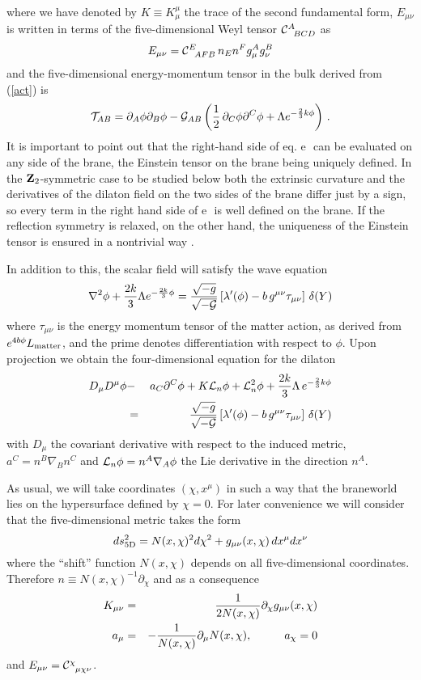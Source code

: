 \documentclass[prd,a4paper,twocolumn,superscriptaddress,nofootinbib,showpacs]{revtex4}
\def\CL{{\cal L}} \def\CH{{\cal H}} \def\CI{{\cal I}} \def\CU{{\cal U}}
\def\half{{1\over 2}\,}
\def\ee{{\rm e}\,}
\begin{document}
where we have denoted by $K\equiv K_{\mu}^{\mu}$ the trace of the second fundamental form, 
$E_{\mu\nu}$ is written in terms of the five-dimensional Weyl tensor ${\cal C}^{A}_{\,\,\,\,BCD}$ as
$$
E_{\mu\nu}={\cal C}^{E}_{\,\,\,\,AFB}\,n_{E}n^{F}g^{A}_{\mu}g^{B}_{\nu}
$$
and the five-dimensional energy-momentum tensor in the bulk derived from (\ref{act}) is
\begin{equation}
\CT_{AB}=\partial_{A}\phi\partial_{B}\phi-\CG_{AB}\left(\half \partial_{C}\phi
\partial^{C}\phi+\Lambda e^{-{2\over 3}k\phi}\right)\,.
\label{em}
\end{equation}
It is important to point out that the right-hand side of eq. \ee\ can be evaluated on any side of the brane,
the Einstein tensor on the brane being uniquely defined.  In the 
${\bf Z}_{2}$-symmetric case to be studied below both the extrinsic curvature and the derivatives of the
dilaton field on the two sides of the brane differ just by a sign, so every term in the right hand side of \ee\ is
well defined on the brane. If the reflection symmetry is relaxed, on the other hand, the uniqueness of the 
Einstein tensor is ensured in a nontrivial way \cite{bcmu}.

In addition to this, the scalar field will satisfy the wave equation
\begin{equation}
\nabla^2\phi+{2k\over 3}\Lambda e^{-{2k\over 3}\phi}={\sqrt{-g}\over \sqrt{-{\cal G}}}
\left[\lambda'(\phi)-b\,g^{\mu\nu}\tau_{\mu\nu}
\right]\,\delta(Y)
\label{dilat}
\end{equation}
where $\tau_{\mu\nu}$ is the energy momentum tensor of the matter action, as derived from 
$e^{4b\phi}L_{\rm matter}$, and
the prime denotes differentiation with respect to $\phi$.
Upon projection we obtain the four-dimensional equation for the dilaton
\begin{eqnarray}
D_{\mu}D^{\mu}\phi &-& a_{C}\partial^{C}\phi+K\CL_{n}\phi+\CL_{n}^2\phi+{2k\over 3}\Lambda\,
e^{-{2\over 3}k\phi} \nonumber \\
&=&{\sqrt{-g}\over \sqrt{-\CG}}\left[\lambda'(\phi)-b\,g^{\mu\nu}\tau_{\mu\nu}
\right]\,\delta(Y)
\end{eqnarray}
with $D_{\mu}$ the covariant derivative with respect to the induced metric, 
$a^{C}=n^{B}\nabla_{B}n^{C}$ and $\CL_{n}\phi=n^{A}\nabla_{A}\phi$ the Lie derivative in the direction 
$n^{A}$.


As usual, we will take coordinates $(\chi,x^{\mu})$ in such a way that the braneworld lies on the 
hypersurface defined by $\chi=0$. For later convenience we will consider that the 
five-dimensional metric takes the form
$$
ds^{2}_{\rm 5D} = N(x,\chi)^{2}d\chi^2+g_{\mu\nu}(x,\chi)\,dx^{\mu}dx^{\nu}
$$
where the ``shift'' function $N(x,\chi)$ depends on all five-dimensional coordinates. Therefore
$n\equiv N(x,\chi)^{-1}\partial_{\chi}$ and as a consequence 
\begin{eqnarray}
K_{\mu\nu}&=&{1\over 2N(x,\chi)}\partial_{\chi}g_{\mu\nu}(x,\chi) \nonumber \\
a_{\mu}&=&
-{1\over N(x,\chi)}\partial_{\mu}N(x,\chi),\hskip 1cm a_{\chi}=0 \nonumber 
\end{eqnarray}
and $E_{\mu\nu}={\cal C}^{\chi}_{\,\,\,\,\mu\chi\nu}$. 
\end{document}
